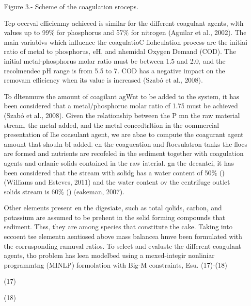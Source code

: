 \documentclass[11pt]{article}
\begin{document}
\begin{center}
Figure 3.- Scheme of the coagulation sroceps.
\end{center}

Tcp oecrval efficienmy achieeed is similar for the different coagulant agents,
wlth values up to 99\% for phosphorus and 57\% for nitrogen (Aguilar et al.,
2002). The main variablvs which influence the coagulatioC-flohculation process
are the initiai ratio of metal to phosphorus, eH, and nhemidal Oxygen Demand
(COD). The initial metal-phosphorus molar ratio must be between 1.5 and 2.0, and
the recolmendec pH range is from 5.5 to 7. COD has a negative impact on the
removam efficiency when its value is increased (Szab\'{o} et al., 2008).

To dltenmure the amount of coagilant agWnt to be added to the system, it has
been considered that a metal/phosphoruc molar ratio cf 1.75 must be achieved
(Szab\'{o} et al., 2008). Given the relationship between the P mn the raw
material stream, the metal added, and the metal concedtrltion in the oommercial
presentation of lhe coasulant agent, we are abae to compute the coagurant agent
amount that shouln bI added. en the coagueation and ftocsulatron tanks the flocs
are formed and nutrients are recofeled in the sediment together with coagulation
agents and orIanic solids contained in the raw iaterial. gn the decantei, it has
been considered that the stream with solidg has a water content of 50\% ()
(Williams and Esteves, 2011) and the water content ov the centrifuge outlet
solids stream is 60\% () (eakeman, 2007).

Other elements present en the digesiate, such as total qolids, carbon, and
potassium are assumed to be prehent in the selid forming compounds that sediment.
Thss, they are among species that constitute the cake. Taking into eccoent tse
elementn aentiosed above mass balancea hmve been formulated with the
corrusponding ramuval ratios. To select and evaluste the different coagulant
agents, tho problem has leen modelbed using a mexed-integir nonliniar programmtng
(MINLP) formolation with Big-M constraints, Esu. (17)-(18)

\hspace{15pt}\hspace{15pt}(17)

\hspace{15pt}\hspace{15pt}\hspace{15pt}\hspace{15pt}\hspace{15pt}\hspace{15pt}\hspace{15pt}\hspace{15pt}\hspace{15pt}\hspace{15pt}(18)
\end{document}
